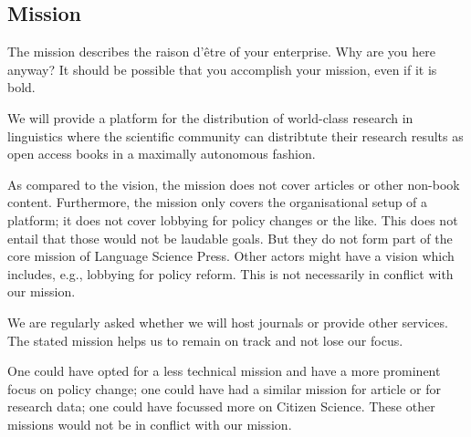 \documentclass[nonflat,smallfont
]{langsci/langscibook}
\newcommand{\background}[1]{ 
  \vspace{5mm}
  \renewcommand{\tblslinecolour}{lsDarkBlue}
  \tblssy[red]{explore2}{Background}{\vspace*{-5mm}#1}
}
\newcommand{\langscisolution}[1]{
  \renewcommand{\tblslinecolour}{lsLightBlue}
  \tblssy{langsci}{LangSci solution}{\vspace*{-5mm}#1}
}
\newcommand{\evaluation}[1]{
  \renewcommand{\tblslinecolour}{lsLightOrange}
  \tblssy{receipt}{Evaluation}{\vspace*{-5mm}#1}
}
\newcommand{\othersolutions}[1]{
  \renewcommand{\tblslinecolour}{lsDarkGreenOne}
  \tblssy{more}{Other solutions}{\vspace*{-5mm}#1}
}
\renewcommand{\tblssy}[4][black!12]{%
  \renewcommand{\langscisymbol}{#2}\renewcommand{\tblsboxcolor}{#1}
  \begin{mdframed}[style=yellowexercise,frametitle={#3}]
    #4
  \end{mdframed}
}
\begin{document}
\subsection{Mission}
\vspace*{5mm}\background{The mission describes the raison d'être of your enterprise. Why are you here anyway? It should be possible that you accomplish your mission, even if it is bold.}
\langscisolution{ 
We will provide a platform for the distribution of world-class research in linguistics where the scientific community can distribtute their research results as open access books in a maximally autonomous fashion.
}
\evaluation{
As compared to the vision, the mission does not cover articles or other non-book content. Furthermore, the mission only covers the organisational setup of a platform; it does not cover lobbying for policy changes or the like. This does not entail that those would not be laudable goals. But they do not form part of the core mission of Language Science Press. Other actors might have a vision which includes, e.g., lobbying for policy reform. This is not necessarily in conflict with our mission.

We are regularly asked whether we will host journals or provide other services. The stated mission helps us to remain on track and not lose our focus.}
\othersolutions{One could have opted for a less technical mission and have a more prominent focus on policy change; one could have had a similar mission for article or for research data; one could have focussed more on Citizen Science. These other missions would not be in conflict with our mission. } 
\end{document}
